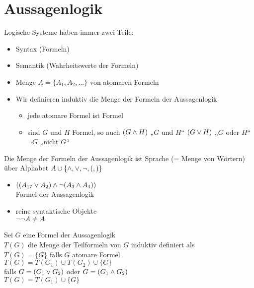 
\section{Aussagenlogik}

Logische Systeme haben immer zwei Teile:
\begin{itemize}
\item Syntax (Formeln)
\item Semantik (Wahrheitswerte der Formeln)
\end{itemize}

\begin{itemize}
\item Menge $A = \{ A_1, A_2, ... \}$ von atomaren Formeln
\item Wir definieren induktiv die Menge der Formeln der Aussagenlogik
    \begin{itemize}
        \item jede atomare Formel ist Formel
        \item sind $G$ und $H$ Formel, so auch $( G \wedge H )$ „$G$ und $H$“ $(G \vee H)$ „$G$ oder $H$“ $\neg G$ „nicht $G$“
    \end{itemize}
\end{itemize}

\bemerkung{}
Die Menge der Formeln der Aussagenlogik ist Sprache (= Menge von Wörtern) über Alphabet $A \cup \{\wedge, \vee, \neg, (, ) \}$\\

\beispiel{}
\begin{itemize}
\item $ \left( ( A_{17} \vee A_2 ) \wedge \neg (A_3 \wedge A_4) \right)$\\
    Formel der Aussagenlogik
\item reine syntaktische Objekte\\
    $\neg \neg A \neq A$
\end{itemize}

\beweis{}
Sei $G$ eine Formel der Aussagenlogik\\
$T(G)$ die Menge der Teilformeln von $G$ induktiv definiert als\\
$T(G) = \{ G \}$ falls $G$ atomare Formel\\
$T(G) = T(G_1) \cup T(G_2) \cup \{G\}$\\
falls $G = (G_1 \vee G_2)$ oder $G=(G_1 \wedge G_2)$\\
$T(G)=T(G_1) \cup \{G\}$\\

